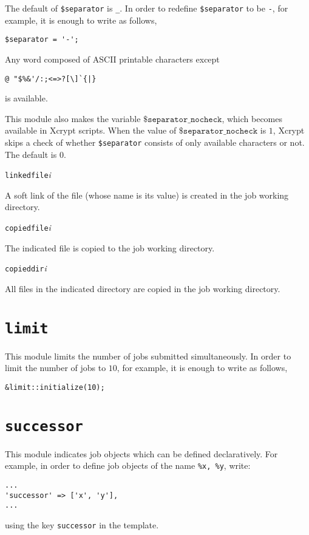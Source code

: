 \documentclass[a4paper,10pt]{report}
\begin{document}
The default of \texttt{\$separator} is \texttt{\_}.  In order to
redefine \texttt{\$separator} to be \texttt{-}, for example, it is
enough to write as follows,
\begin{boxnote}
\begin{verbatim}
$separator = '-';
\end{verbatim}
\end{boxnote}
\vspace{\baselineskip}

Any word composed of ASCII printable characters except
\begin{center}
\verb*+@ "$%&'/:;<=>?[\]`{|}+        %
\end{center}
is available.

This module also makes the variable $\texttt{\$separator\_nocheck}$,
which becomes available in Xcrypt scripts.  When the value of
$\texttt{\$separator\_nocheck}$ is $1$, Xcrypt skips a check of
whether \texttt{\$separator} consists of only available characters or not.
The default is $0$.


\texttt{linkedfile}\textit{i}

A soft link of the file (whose name is its value) is created in the
job working directory.

\texttt{copiedfile}\textit{i}

The indicated file is copied to the job working directory.

\texttt{copieddir}\textit{i}

All files in the indicated directory are copied
in the job working directory.
\fi


\section{\texttt{limit}}

This module limits the number of jobs submitted simultaneously.
In order to limit the number of jobs to $10$, for example, it is enough to
write as follows,
\begin{boxnote}
\begin{verbatim}
&limit::initialize(10);
\end{verbatim}
\end{boxnote}

\section{\texttt{successor}}

This module indicates job objects which can be defined declaratively.
For example, in order to define job objects of the name \texttt{\%x,
\%y}, write:
\begin{boxnote}
\begin{verbatim}
...
'successor' => ['x', 'y'],
...
\end{verbatim}
\end{boxnote}
\vspace{\baselineskip}
\noindent
using the key \texttt{successor} in the template.
\end{document}
